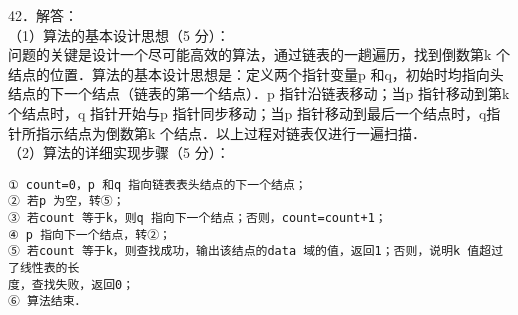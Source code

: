 42．解答： \\
（1）算法的基本设计思想（5 分）： \\
问题的关键是设计一个尽可能高效的算法，通过链表的一趟遍历，找到倒数第k 个结点的位置．算法的基本设计思想是：定义两个指针变量p 和q，初始时均指向头结点的下一个结点（链表的第一个结点）．p 指针沿链表移动；当p 指针移动到第k 个结点时，q 指针开始与p 指针同步移动；当p 指针移动到最后一个结点时，q指针所指示结点为倒数第k 个结点．以上过程对链表仅进行一遍扫描． \\
（2）算法的详细实现步骤（5 分）： 
\begin{lstlisting}
① count=0，p 和q 指向链表表头结点的下一个结点；
② 若p 为空，转⑤；
③ 若count 等于k，则q 指向下一个结点；否则，count=count+1；
④ p 指向下一个结点，转②；
⑤ 若count 等于k，则查找成功，输出该结点的data 域的值，返回1；否则，说明k 值超过了线性表的长
度，查找失败，返回0；
⑥ 算法结束．
\end{lstlisting}
